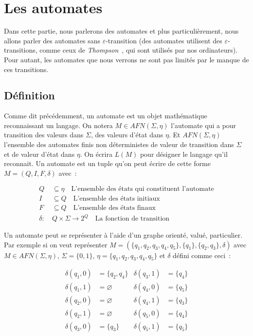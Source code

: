 \section{Les automates}

Dans cette partie, nous parlerons des automates et plus particulièrement, nous
allons parler des automates sans \(\varepsilon\)-transition (des automates
utilisent des \(\varepsilon\)-transitions, comme ceux de
\textit{Thompson}~\cite{thompson1968programming}, qui sont utilisés par nos
ordinateurs). Pour autant, les automates que nous verrons ne sont pas limités
par le manque de ces transitions.

\subsection{Définition}

Comme dit précédemment, un automate est un objet mathématique reconnaissant un
langage. On notera \(M \in AFN(\Sigma, \eta)\) l'automate qui a pour transition
des valeurs dans \(\Sigma\), des valeurs \og{}d'état\fg{} dans \(\eta\). Et
\(AFN(\Sigma, \eta)\) l'ensemble des automates finis non déterministes de
valeur de transition dans \(\Sigma\) et de valeur d'état dans \(\eta\). On
écrira \(L(M)\) pour désigner le langage qu'il reconnait. Un automate est un
tuple qu'on peut écrire de cette forme \(M = (Q, I, F, \delta)\) avec~:

\begin{align*}
    Q & \subseteq \eta \quad \text{L'ensemble des états qui constituent
    l'automate}                                                                \\
    I & \subseteq Q \quad \text{L'ensemble des états initiaux}          \\
    F & \subseteq Q \quad \text{L'ensemble des états finaux}            \\
    \delta:~ & Q \times \Sigma \to 2^Q \quad \text{La fonction de transition}
\end{align*}

Un automate peut se représenter à l'aide d'un graphe orienté, valué,
particulier. Par exemple si on veut représenter \(M = (\{q_1, q_2, q_3, q_4,
q_5\}, \{q_1\},\{q_2, q_3\}, \delta)\) avec \(M \in AFN(\Sigma, \eta)\),
\(\Sigma = \{0, 1\}\), \(\eta = \{q_1, q_2, q_3, q_4, q_5\}\) et \(\delta\)
défini comme ceci~:

\begin{align*}
    \delta(q_1, 0) & = \{q_2, q_4\} & \delta(q_3, 1) & = \{q_4\} \\
    \delta(q_1, 1) & = \varnothing  & \delta(q_4, 0) & = \{q_5\} \\
    \delta(q_2, 0) & = \varnothing  & \delta(q_4, 1) & = \{q_3\} \\
    \delta(q_2, 1) & = \varnothing  & \delta(q_5, 0) & = \{q_4\} \\
    \delta(q_3, 0) & = \{q_3\}      & \delta(q_5, 1) & = \{q_5\} \\
\end{align*}

